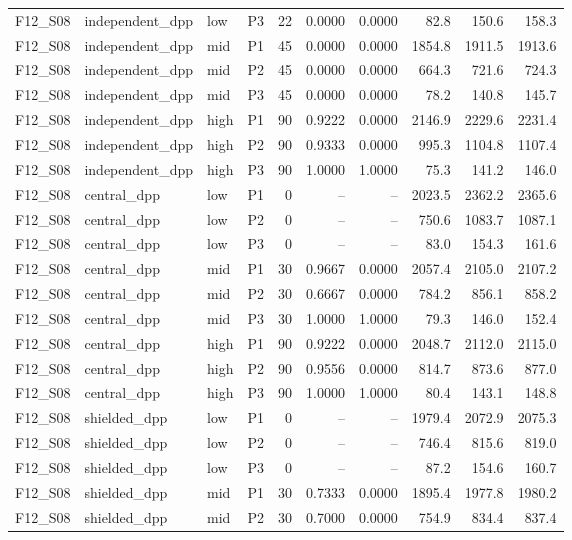 \begin{longtable}{llllrrrrrr}
F12\_S08 & independent\_dpp & low & P3 & 22 & 0.0000 & 0.0000 & 82.8 & 150.6 & 158.3 \\
F12\_S08 & independent\_dpp & mid & P1 & 45 & 0.0000 & 0.0000 & 1854.8 & 1911.5 & 1913.6 \\
F12\_S08 & independent\_dpp & mid & P2 & 45 & 0.0000 & 0.0000 & 664.3 & 721.6 & 724.3 \\
F12\_S08 & independent\_dpp & mid & P3 & 45 & 0.0000 & 0.0000 & 78.2 & 140.8 & 145.7 \\
F12\_S08 & independent\_dpp & high & P1 & 90 & 0.9222 & 0.0000 & 2146.9 & 2229.6 & 2231.4 \\
F12\_S08 & independent\_dpp & high & P2 & 90 & 0.9333 & 0.0000 & 995.3 & 1104.8 & 1107.4 \\
F12\_S08 & independent\_dpp & high & P3 & 90 & 1.0000 & 1.0000 & 75.3 & 141.2 & 146.0 \\
F12\_S08 & central\_dpp & low & P1 & 0 & -- & -- & 2023.5 & 2362.2 & 2365.6 \\
F12\_S08 & central\_dpp & low & P2 & 0 & -- & -- & 750.6 & 1083.7 & 1087.1 \\
F12\_S08 & central\_dpp & low & P3 & 0 & -- & -- & 83.0 & 154.3 & 161.6 \\
F12\_S08 & central\_dpp & mid & P1 & 30 & 0.9667 & 0.0000 & 2057.4 & 2105.0 & 2107.2 \\
F12\_S08 & central\_dpp & mid & P2 & 30 & 0.6667 & 0.0000 & 784.2 & 856.1 & 858.2 \\
F12\_S08 & central\_dpp & mid & P3 & 30 & 1.0000 & 1.0000 & 79.3 & 146.0 & 152.4 \\
F12\_S08 & central\_dpp & high & P1 & 90 & 0.9222 & 0.0000 & 2048.7 & 2112.0 & 2115.0 \\
F12\_S08 & central\_dpp & high & P2 & 90 & 0.9556 & 0.0000 & 814.7 & 873.6 & 877.0 \\
F12\_S08 & central\_dpp & high & P3 & 90 & 1.0000 & 1.0000 & 80.4 & 143.1 & 148.8 \\
F12\_S08 & shielded\_dpp & low & P1 & 0 & -- & -- & 1979.4 & 2072.9 & 2075.3 \\
F12\_S08 & shielded\_dpp & low & P2 & 0 & -- & -- & 746.4 & 815.6 & 819.0 \\
F12\_S08 & shielded\_dpp & low & P3 & 0 & -- & -- & 87.2 & 154.6 & 160.7 \\
F12\_S08 & shielded\_dpp & mid & P1 & 30 & 0.7333 & 0.0000 & 1895.4 & 1977.8 & 1980.2 \\
F12\_S08 & shielded\_dpp & mid & P2 & 30 & 0.7000 & 0.0000 & 754.9 & 834.4 & 837.4 \\

\end{longtable}
